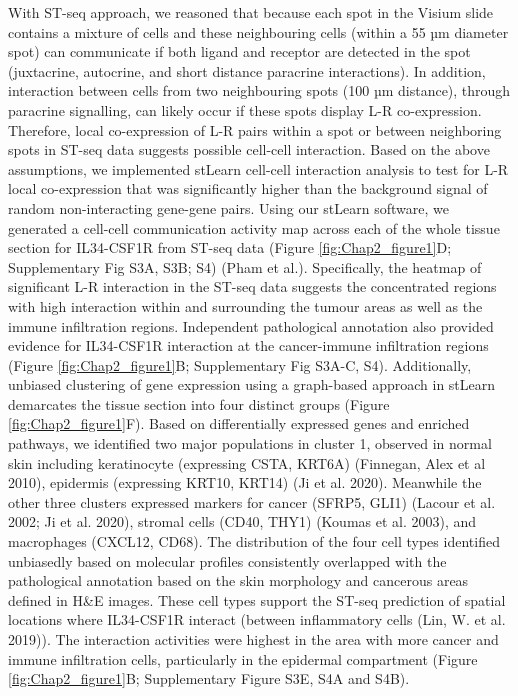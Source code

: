 With ST-seq approach, we reasoned that because each spot in the Visium slide contains a mixture of cells and these neighbouring cells (within a 55 µm diameter spot) can communicate if both ligand and receptor are detected in the spot (juxtacrine, autocrine, and short distance paracrine interactions). In addition, interaction between cells from two neighbouring spots (100 µm distance), through paracrine signalling, can likely occur if these spots display L-R co-expression. Therefore, local co-expression of L-R pairs within a spot or between neighboring spots in ST-seq data suggests possible cell-cell interaction. Based on the above assumptions, we implemented stLearn cell-cell interaction analysis to test for L-R local co-expression that was significantly higher than the background signal of random non-interacting gene-gene pairs. Using our stLearn software, we generated a cell-cell communication activity map across each of the whole tissue section for IL34-CSF1R from ST-seq data (Figure \ref{fig:Chap2_figure1}D; Supplementary Fig S3A, S3B; S4) (Pham et al.). Specifically, the heatmap of significant L-R interaction in the ST-seq data suggests the concentrated regions with high interaction within and surrounding the tumour areas as well as the immune infiltration regions. Independent pathological annotation also provided evidence for IL34-CSF1R interaction at the cancer-immune infiltration regions (Figure \ref{fig:Chap2_figure1}B; Supplementary Fig S3A-C, S4). Additionally, unbiased clustering of gene expression using a graph-based approach in stLearn demarcates the tissue section into four distinct groups (Figure \ref{fig:Chap2_figure1}F). Based on differentially expressed genes and enriched pathways, we identified two major populations in cluster 1, observed in normal skin including keratinocyte (expressing CSTA, KRT6A) (Finnegan, Alex et al 2010), epidermis (expressing KRT10, KRT14) (Ji et al. 2020). Meanwhile the other three clusters expressed markers for cancer (SFRP5, GLI1) (Lacour et al. 2002; Ji et al. 2020), stromal cells (CD40, THY1) (Koumas et al. 2003), and macrophages (CXCL12, CD68). The distribution of the four cell types identified unbiasedly based on molecular profiles consistently overlapped with the pathological annotation based on the skin morphology and cancerous areas defined in H\&E images. These cell types support the ST-seq prediction of spatial locations where IL34-CSF1R interact (between inflammatory cells (Lin, W. et al. 2019)). The interaction activities were highest in the area with more cancer and immune infiltration cells, particularly in the epidermal compartment (Figure \ref{fig:Chap2_figure1}B; Supplementary Figure S3E, S4A and S4B).  

